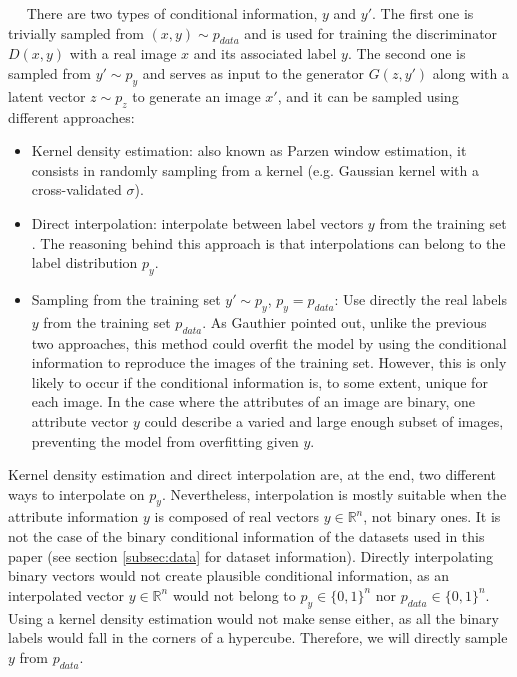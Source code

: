 \documentclass{article}
\newcommand{\minisection}[1]{\vspace{0.04in} \noindent {\bf #1}\ \ }
\begin{document}
\minisection{Conditional sampling} There are two types of conditional information, $y$ and $y'$. The first one is trivially sampled from $(x,y) \sim p_{data}$ and is used for training the discriminator $D(x,y)$ with a real image $x$ and its associated label $y$. The second one is sampled from $y' \sim p_y$ and serves as input to the generator $G(z,y')$ along with a latent vector $z \sim p_z$ to generate an image $x'$, and it can be sampled using different approaches:
\begin{itemize}
\item Kernel density estimation: also known as Parzen window estimation, it consists in randomly sampling from a kernel (e.g. Gaussian kernel with a cross-validated $\sigma$). \item Direct interpolation: interpolate between label vectors $y$ from the training set \citep{Reed2016}. The reasoning behind this approach is that interpolations can belong to the label distribution $p_y$.
\item Sampling from the training set $y' \sim p_y$, $p_y=p_{data}$: Use directly the real labels $y$ from the training set $p_{data}$. As Gauthier \citep{Gauthier2014} pointed out, unlike the previous two approaches, this method could overfit the model by using the conditional information to reproduce the images of the training set. However, this is only likely to occur if the conditional information is, to some extent, unique for each image. In the case where the attributes of an image are binary, one attribute vector $y$ could describe a varied and large enough subset of images, preventing the model from overfitting given $y$.
\end{itemize}

Kernel density estimation and direct interpolation are, at the end, two different ways to interpolate on $p_y$. Nevertheless, interpolation is mostly suitable when the attribute information $y$ is composed of real vectors $y \in \mathbb{R}^n$, not binary ones. It is not the case of the binary conditional information of the datasets used in this paper (see section \ref{subsec:data} for dataset information). Directly interpolating binary vectors would not create plausible conditional information, as an interpolated vector $y\in \mathbb{R}^n$ would not belong to $p_y \in \{0,1\}^n$ nor $p_{data}\in\{0,1\}^n$. Using a kernel density estimation would not make sense either, as all the binary labels would fall in the corners of a hypercube. Therefore, we will directly sample $y$ from $p_{data}$.
\end{document}
